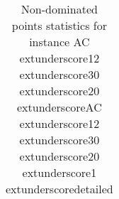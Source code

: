 \begin{table}
\caption{Non-dominated points statistics for instance AC	extunderscore12	extunderscore30	extunderscore20	extunderscoreAC	extunderscore12	extunderscore30	extunderscore20	extunderscore1	extunderscoredetailed}
\label{tab:stats/AC_12_30_20_AC_12_30_20_1_detailed}
\begin{tabular}{}
\toprule
\midrule
\bottomrule
\end{tabular}
\end{table}
